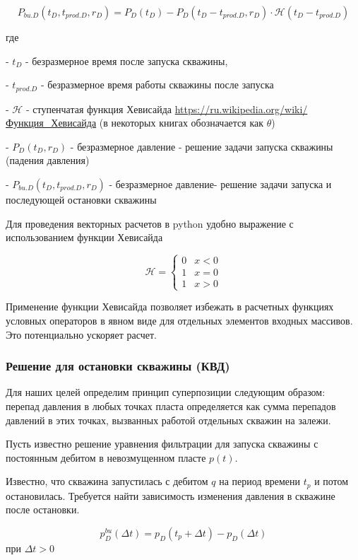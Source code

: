 \begin{equation}
	P_{bu.D}(t_D, t_{prod.D}, r_D) = P_D(t_D) - P_D(t_D-t_{prod.D}, r_D) \cdot \mathcal{H}(t_D-t_{prod.D}) 
\end{equation}

где

- $t_D$ - безразмерное время после запуска скважины,

- $t_{prod.D}$ - безразмерное время работы скважины после запуска

- $\mathcal{H}$ - ступенчатая функция Хевисайда \url{https://ru.wikipedia.org/wiki/Функция_Хевисайда} (в некоторых книгах обозначается как $\theta$)

- $P_D(t_D, r_D)$ - безразмерное давление - решение задачи запуска скважины (падения давления)

- $P_{bu.D}(t_D, t_{prod.D}, r_D)$ - безразмерное давление- решение задачи запуска  и последующей остановки скважины

Для проведения векторных расчетов в python удобно выражение с использованием функции Хевисайда

$$ \mathcal{H} = \begin{cases}0 & x < 0\\1 & x = 0\\1 & x > 0\end{cases}$$

Применение функции Хевисайда позволяет избежать в расчетных функциях условных операторов в явном виде для отдельных элементов входных массивов. Это потенциально ускоряет расчет. 



\subsubsection{Решение для остановки скважины (КВД)}

Для наших целей определим принцип суперпозиции следующим образом: перепад давления в любых точках пласта определяется как сумма перепадов давлений в этих точках, вызванных работой отдельных скважин на залежи. 

Пусть известно решение уравнения фильтрации для запуска скважины с постоянным дебитом в невозмущенном пласте   $p(t)$. 

Известно, что скважина запустилась с дебитом $q$ на период времени $t_p$ и потом остановилась. Требуется найти зависимость изменения давления в скважине после остановки.

$$ p_{D}^{bu}(\Delta t)=p_D(t_p +\Delta t) - p_D(\Delta t)$$  при $\Delta t > 0$

